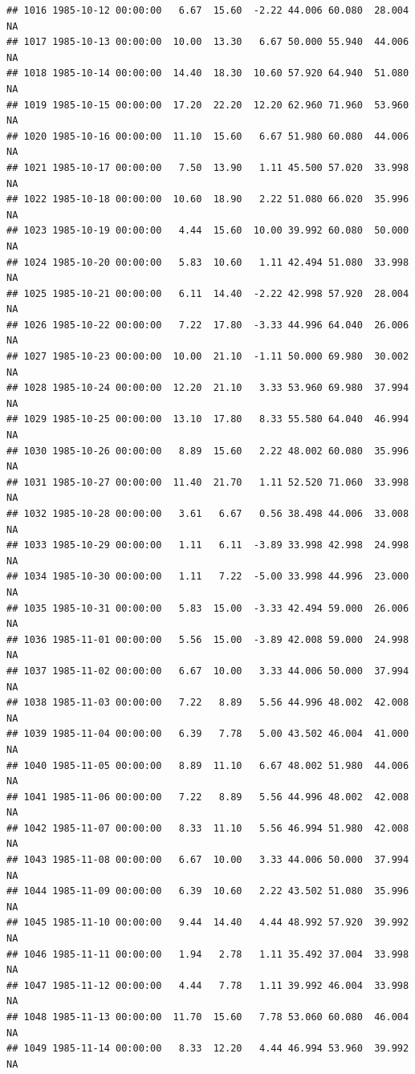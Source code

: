 \documentclass{article}\usepackage{graphicx, color}
\makeatletter
\newenvironment{kframe}{%
 \def\at@end@of@kframe{}%
 \ifinner\ifhmode%
  \def\at@end@of@kframe{\end{minipage}}%
  \begin{minipage}{\columnwidth}%
 \fi\fi%
 \def\FrameCommand##1{\hskip\@totalleftmargin \hskip-\fboxsep
 \colorbox{shadecolor}{##1}\hskip-\fboxsep
     \hskip-\linewidth \hskip-\@totalleftmargin \hskip\columnwidth}%
 \MakeFramed {\advance\hsize-\width
   \@totalleftmargin\z@ \linewidth\hsize
   \@setminipage}}%
 {\par\unskip\endMakeFramed%
 \at@end@of@kframe}
\newenvironment{knitrout}{}{} %
\makeatother
\begin{document}
\begin{knitrout}
\begin{kframe}
\begin{verbatim}
## 1016 1985-10-12 00:00:00   6.67  15.60  -2.22 44.006 60.080  28.004     NA
## 1017 1985-10-13 00:00:00  10.00  13.30   6.67 50.000 55.940  44.006     NA
## 1018 1985-10-14 00:00:00  14.40  18.30  10.60 57.920 64.940  51.080     NA
## 1019 1985-10-15 00:00:00  17.20  22.20  12.20 62.960 71.960  53.960     NA
## 1020 1985-10-16 00:00:00  11.10  15.60   6.67 51.980 60.080  44.006     NA
## 1021 1985-10-17 00:00:00   7.50  13.90   1.11 45.500 57.020  33.998     NA
## 1022 1985-10-18 00:00:00  10.60  18.90   2.22 51.080 66.020  35.996     NA
## 1023 1985-10-19 00:00:00   4.44  15.60  10.00 39.992 60.080  50.000     NA
## 1024 1985-10-20 00:00:00   5.83  10.60   1.11 42.494 51.080  33.998     NA
## 1025 1985-10-21 00:00:00   6.11  14.40  -2.22 42.998 57.920  28.004     NA
## 1026 1985-10-22 00:00:00   7.22  17.80  -3.33 44.996 64.040  26.006     NA
## 1027 1985-10-23 00:00:00  10.00  21.10  -1.11 50.000 69.980  30.002     NA
## 1028 1985-10-24 00:00:00  12.20  21.10   3.33 53.960 69.980  37.994     NA
## 1029 1985-10-25 00:00:00  13.10  17.80   8.33 55.580 64.040  46.994     NA
## 1030 1985-10-26 00:00:00   8.89  15.60   2.22 48.002 60.080  35.996     NA
## 1031 1985-10-27 00:00:00  11.40  21.70   1.11 52.520 71.060  33.998     NA
## 1032 1985-10-28 00:00:00   3.61   6.67   0.56 38.498 44.006  33.008     NA
## 1033 1985-10-29 00:00:00   1.11   6.11  -3.89 33.998 42.998  24.998     NA
## 1034 1985-10-30 00:00:00   1.11   7.22  -5.00 33.998 44.996  23.000     NA
## 1035 1985-10-31 00:00:00   5.83  15.00  -3.33 42.494 59.000  26.006     NA
## 1036 1985-11-01 00:00:00   5.56  15.00  -3.89 42.008 59.000  24.998     NA
## 1037 1985-11-02 00:00:00   6.67  10.00   3.33 44.006 50.000  37.994     NA
## 1038 1985-11-03 00:00:00   7.22   8.89   5.56 44.996 48.002  42.008     NA
## 1039 1985-11-04 00:00:00   6.39   7.78   5.00 43.502 46.004  41.000     NA
## 1040 1985-11-05 00:00:00   8.89  11.10   6.67 48.002 51.980  44.006     NA
## 1041 1985-11-06 00:00:00   7.22   8.89   5.56 44.996 48.002  42.008     NA
## 1042 1985-11-07 00:00:00   8.33  11.10   5.56 46.994 51.980  42.008     NA
## 1043 1985-11-08 00:00:00   6.67  10.00   3.33 44.006 50.000  37.994     NA
## 1044 1985-11-09 00:00:00   6.39  10.60   2.22 43.502 51.080  35.996     NA
## 1045 1985-11-10 00:00:00   9.44  14.40   4.44 48.992 57.920  39.992     NA
## 1046 1985-11-11 00:00:00   1.94   2.78   1.11 35.492 37.004  33.998     NA
## 1047 1985-11-12 00:00:00   4.44   7.78   1.11 39.992 46.004  33.998     NA
## 1048 1985-11-13 00:00:00  11.70  15.60   7.78 53.060 60.080  46.004     NA
## 1049 1985-11-14 00:00:00   8.33  12.20   4.44 46.994 53.960  39.992     NA

\end{verbatim}
\end{kframe}
\end{knitrout}
\end{document}

